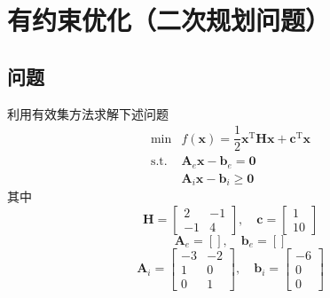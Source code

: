 \section{有约束优化（二次规划问题）}
\subsection{问题}
利用有效集方法求解下述问题
\[
    \begin{aligned}
        \min & f(\boldsymbol{x}) = \dfrac{1}{2}\boldsymbol{x}^{\mathrm{T}}\boldsymbol{Hx} + \boldsymbol{c}^{\mathrm{T}}\boldsymbol{x}\\
        \operatorname*{s.t.} & \boldsymbol{A}_e\boldsymbol{x}-\boldsymbol{b}_e = \boldsymbol{0}\\
        & \boldsymbol{A}_i\boldsymbol{x}-\boldsymbol{b}_i \geqslant  \boldsymbol{0}
    \end{aligned}
\]
其中
\[
    \boldsymbol{H} = \begin{bmatrix}
        2 & -1\\
        -1 & 4
    \end{bmatrix},\quad\boldsymbol{c} = \begin{bmatrix}
        1 \\ 10
    \end{bmatrix}
\]
\[
    \boldsymbol{A}_e = [],\quad\boldsymbol{b}_e = []
\]
\[
    \boldsymbol{A}_i = \begin{bmatrix}
        -3 & -2\\
        1 & 0 \\
        0 & 1
    \end{bmatrix},\quad\boldsymbol{b}_i = \begin{bmatrix}
        -6 \\ 0 \\ 0
    \end{bmatrix}
\]

